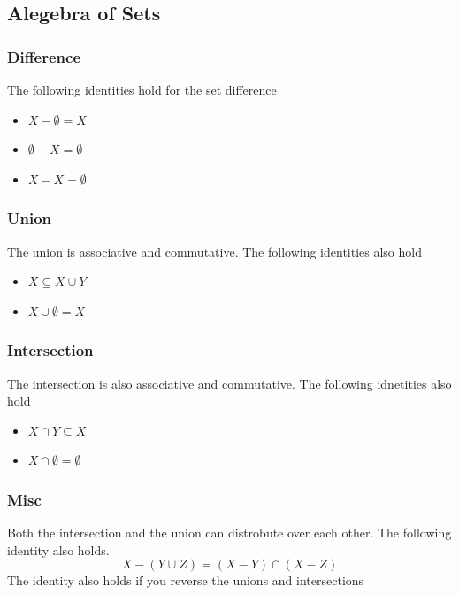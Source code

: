 \documentclass{article}
\begin{document}
\subsection{Alegebra of Sets}
\subsubsection{Difference}
The following identities hold for the set difference
\begin{itemize}
    \item $X - \emptyset = X$
    \item $\emptyset - X = \emptyset$
    \item $X - X = \emptyset$
\end{itemize}
\subsubsection{Union}
The union is associative and commutative. The following identities also hold
\begin{itemize}
    \item $X \subseteq X \cup Y$
    \item $X \cup \emptyset = X$
\end{itemize} 
\subsubsection{Intersection}
The intersection is also associative and commutative. The following idnetities also hold
\begin{itemize}
    \item $X \cap Y \subseteq X$
    \item $X \cap \emptyset = \emptyset$
\end{itemize}
\subsubsection{Misc}
Both the intersection and the union can distrobute over each other. The following identity also holds.
\[X - (Y \cup Z) = (X - Y) \cap (X - Z)\]
The identity also holds if you reverse the unions and intersections
\end{document}
